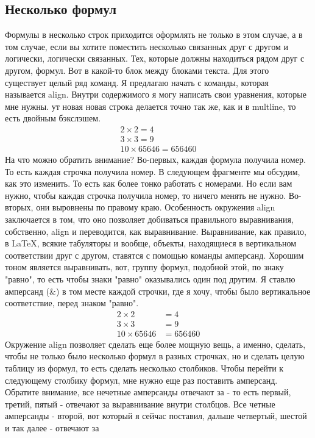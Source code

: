 \documentclass[a4paper,12pt]{article} %
\begin{document}
{\subsection{Несколько формул}
Формулы в несколько строк приходится
оформлять не только в этом случае, а в том случае, если вы хотите поместить
несколько связанных друг с другом и логически, логически
связанных. Тех, которые должны находиться рядом друг с другом,
формул. Вот в какой-то блок между блоками текста. Для этого существует целый ряд команд. Я предлагаю начать с команды, которая
называется align.  Внутри содержимого я могу написать свои
уравнения, которые мне нужны. ут новая новая строка делается точно так
же, как и в multline, то есть двойным
бэкслэшем.
\begin{align}
2\times 2=4\\
3\times 3=9\\
10\times 65646 = 656460
\end{align}
На что можно обратить внимание? Во-первых, каждая формула получила номер. То есть каждая строчка получила номер. В следующем фрагменте мы обсудим, как это
изменить. То есть как более тонко работать с
номерами. Но если вам нужно, чтобы каждая строчка
получила номер, то ничего менять не нужно. Во-вторых, они выровнены по правому краю. Особенность окружения align заключается в
том, что оно позволяет добиваться правильного
выравнивания, собственно, align и переводится, как выравнивание. Выравнивание, как правило, в LaTeX, всякие
табуляторы и вообще, объекты, находящиеся в вертикальном соответствии друг с другом,
ставятся с помощью команды амперсанд. Хорошим тоном является выравнивать,
вот, группу формул, подобной этой, по знаку "равно", то есть чтобы знаки
"равно" оказывались один под другим. Я ставлю амперсанд (\&) в том месте
каждой строчки, где я хочу, чтобы было вертикальное соответствие, перед
знаком "равно".
\begin{align}
2\times 2&=4\\
3\times 3&=9\\
10\times 65646 &= 656460
\end{align}
Окружение align позволяет сделать
еще более мощную вещь, а именно, сделать, чтобы не только
было несколько формул в разных строчках, но и
сделать целую таблицу из формул, то есть сделать
несколько столбиков. Чтобы перейти к следующему столбику
формул, мне нужно еще раз поставить амперсанд. Обратите внимание, все нечетные
амперсанды отвечают за - то есть первый, третий, пятый - отвечают за
выравнивание внутри столбцов. Все четные амперсанды - второй, вот который
я сейчас поставил, дальше четвертый, шестой и так далее - отвечают за
}
\end{document}
